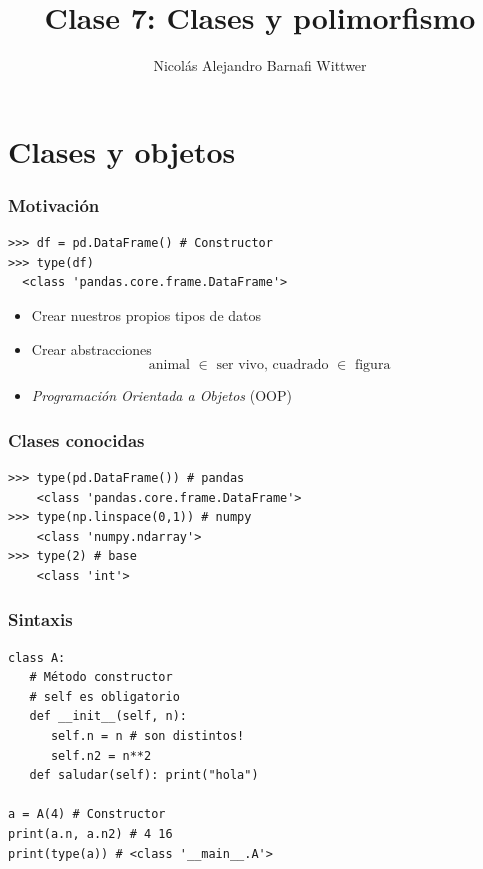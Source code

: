 \documentclass[14pt,aspectratio=169,xcolor=dvipsnames]{beamer}
\title[short title]{Clase 7: Clases y polimorfismo}
\subtitle{}
\author[NA Barnafi] {Nicolás Alejandro Barnafi Wittwer}
\institute[UC|CMM] 
{
    Pontificia Universidad Católica de Chile \\
    Centro de Modelamiento Matemático
}
\date{}
\begin{document}
\begin{frame}
    \maketitle
\end{frame}
\section{Clases y objetos}
\begin{frame}[fragile]\frametitle{Motivación}
    \begin{verbatim}
>>> df = pd.DataFrame() # Constructor
>>> type(df)
  <class 'pandas.core.frame.DataFrame'>
    \end{verbatim}
    \begin{itemize}
        \item Crear nuestros propios tipos de datos
        \item Crear abstracciones 
    \[ \text{animal $\in$ ser vivo, cuadrado $\in$ figura }\]
        \item \emph{Programación Orientada a Objetos} (OOP)
    \end{itemize}
\end{frame}
\begin{frame}[fragile]\frametitle{Clases conocidas}
    \begin{verbatim}
>>> type(pd.DataFrame()) # pandas
    <class 'pandas.core.frame.DataFrame'>
>>> type(np.linspace(0,1)) # numpy
    <class 'numpy.ndarray'>
>>> type(2) # base
    <class 'int'>
    \end{verbatim}
\end{frame}
\begin{frame}[fragile]\frametitle{Sintaxis}
    \begin{verbatim}
class A:
   # Método constructor
   # self es obligatorio
   def __init__(self, n):
      self.n = n # son distintos!
      self.n2 = n**2
   def saludar(self): print("hola")

a = A(4) # Constructor
print(a.n, a.n2) # 4 16
print(type(a)) # <class '__main__.A'>
    \end{verbatim}

\end{frame}
\end{document}
